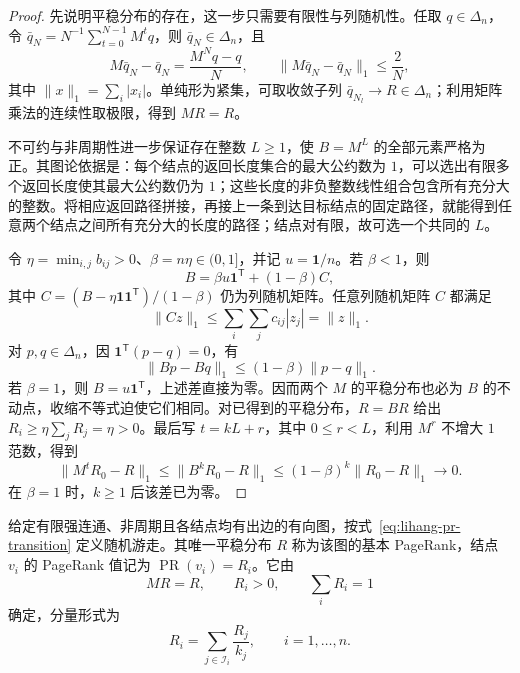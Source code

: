 \begin{proof}
先说明平稳分布的存在，这一步只需要有限性与列随机性。任取 $q\in\Delta_n$，令 $\bar q_N=N^{-1}\sum_{t=0}^{N-1}M^tq$，则 $\bar q_N\in\Delta_n$，且
\[
    M\bar q_N-\bar q_N=\frac{M^Nq-q}{N},\qquad
    \|M\bar q_N-\bar q_N\|_1\leq\frac2N,
\]
其中 $\|x\|_1=\sum_i|x_i|$。单纯形为紧集，可取收敛子列 $\bar q_{N_l}\to R\in\Delta_n$；利用矩阵乘法的连续性取极限，得到 $MR=R$。

不可约与非周期性进一步保证存在整数 $L\geq1$，使 $B=M^L$ 的全部元素严格为正。其图论依据是：每个结点的返回长度集合的最大公约数为 $1$，可以选出有限多个返回长度使其最大公约数仍为 $1$；这些长度的非负整数线性组合包含所有充分大的整数。将相应返回路径拼接，再接上一条到达目标结点的固定路径，就能得到任意两个结点之间所有充分大的长度的路径；结点对有限，故可选一个共同的 $L$。

令 $\eta=\min_{i,j}b_{ij}>0$、$\beta=n\eta\in(0,1]$，并记 $u=\boldsymbol1/n$。若 $\beta<1$，则
\[
    B=\beta u\boldsymbol1^{\mathsf T}+(1-\beta)C,
\]
其中 $C=(B-\eta\boldsymbol1\boldsymbol1^{\mathsf T})/(1-\beta)$ 仍为列随机矩阵。任意列随机矩阵 $C$ 都满足
\[
    \|Cz\|_1
    \leq\sum_i\sum_j c_{ij}|z_j|=\|z\|_1.
\]
对 $p,q\in\Delta_n$，因 $\boldsymbol1^{\mathsf T}(p-q)=0$，有
\[
    \|Bp-Bq\|_1\leq(1-\beta)\|p-q\|_1.
\]
若 $\beta=1$，则 $B=u\boldsymbol1^{\mathsf T}$，上述差直接为零。因而两个 $M$ 的平稳分布也必为 $B$ 的不动点，收缩不等式迫使它们相同。对已得到的平稳分布，$R=BR$ 给出 $R_i\geq\eta\sum_jR_j=\eta>0$。最后写 $t=kL+r$，其中 $0\leq r<L$，利用 $M^r$ 不增大 $1$ 范数，得到
\[
    \|M^tR_0-R\|_1
    \leq\|B^kR_0-R\|_1
    \leq(1-\beta)^k\|R_0-R\|_1\longrightarrow0.
\]
在 $\beta=1$ 时，$k\geq1$ 后该差已为零。
\end{proof}

\begin{definition}[基本 PageRank]
\label{def:lihang-pr-basic}
给定有限强连通、非周期且各结点均有出边的有向图，按式~\eqref{eq:lihang-pr-transition} 定义随机游走。其唯一平稳分布 $R$ 称为该图的基本 PageRank，结点 $v_i$ 的 PageRank 值记为 $\operatorname{PR}(v_i)=R_i$。它由
\begin{equation}
\label{eq:lihang-pr-basic-equations}
    MR=R,\qquad R_i>0,\qquad \sum_iR_i=1
\end{equation}
确定，分量形式为
\begin{equation}
\label{eq:lihang-pr-basic-components}
    R_i=\sum_{j\in\mathcal I_i}\frac{R_j}{k_j},\qquad i=1,\ldots,n.
\end{equation}
\end{definition}

